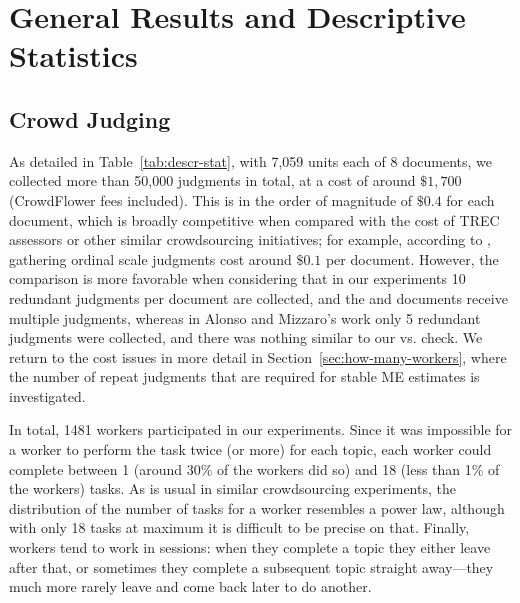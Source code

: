 
\section{General Results and Descriptive Statistics}
\label{sec:descr-stat}


\subsection{Crowd Judging}
\label{sec:crowd-judging}

As detailed in Table~\ref{tab:descr-stat}, with 7,059 units each of
8 documents, we collected more than 50,000 judgments in total,
at a cost of around $\$1,700$ (CrowdFlower fees included).
This is in the order of magnitude of $\$0.4$ for each document, which
is broadly competitive when compared with the cost of TREC assessors
or other similar crowdsourcing initiatives; for example, according to
\citet[Footnote~2]{Alonso:2012}, gathering ordinal scale judgments
cost around $\$0.1$ per document.
However, the comparison is more favorable when considering that in our
experiments 10 redundant judgments per document are collected, and the
\nkn and \hkh documents receive multiple judgments, whereas in Alonso
and Mizzaro's work only 5 redundant judgments were collected, and
there was nothing similar to our \nkn vs. 
\hkh check.
We return to the cost issues in more detail in 
Section~\ref{sec:how-many-workers}, where the number of repeat
judgments that are required for stable ME estimates is investigated.  

In total, 1481 workers participated in our experiments. 
Since it was impossible for a worker to perform the task twice (or
more) for each topic, each worker could complete between 1
(around 30\% of the workers did so) and 18 (less than 1\% of the
workers) tasks.
As is usual in similar crowdsourcing experiments, the distribution
of the number of tasks for a worker resembles a power law, although
with only 18 tasks at maximum it is difficult to be precise on that.
Finally, workers tend to work in sessions: when they complete a topic they
either leave after that, or sometimes they complete a subsequent topic
straight away---they much more rarely leave and come back later to
do another.

